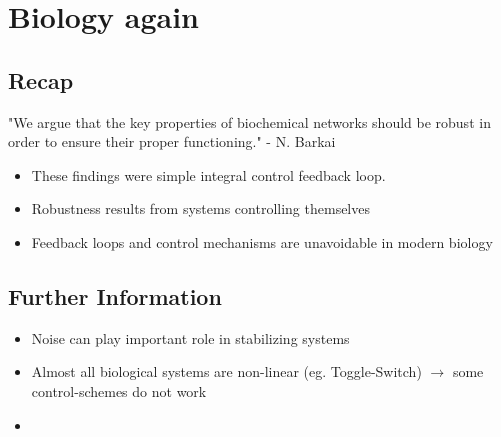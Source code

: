 \section{Biology again}
\label{sec:biology-again}
\subsection{Recap}
\label{subsec:}
\begin{frame}{\insertsubsection}
    "We argue that the key properties of biochemical networks should be robust in order to ensure their proper functioning." - N. Barkai~\cite{Barkai1997}
    \begin{itemize}[<+->]
        \item These findings were simple integral control feedback loop.
        \item Robustness results from systems controlling themselves
        \item Feedback loops and control mechanisms are unavoidable in modern biology
    \end{itemize}
\end{frame}
%
%
\subsection{Further Information}
\begin{frame}{\insertsubsection}
    \begin{itemize}[<+->]
        \item Noise can play important role in stabilizing systems
        \item Almost all biological systems are non-linear (eg. Toggle-Switch) $\rightarrow$ some control-schemes do not work
        \item 
    \end{itemize}
\end{frame}
